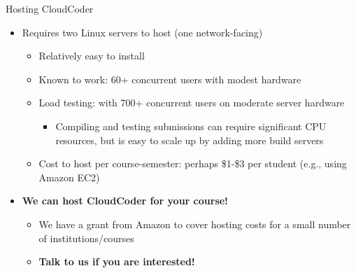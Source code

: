 \documentclass{beamer}
\begin{document}
\begin{frame}{Hosting CloudCoder}

\begin{itemize}
  \item Requires two Linux servers to host (one network-facing)
    \begin{itemize}
    \item Relatively easy to install
    \item Known to work: 60+ concurrent users with modest hardware
    \item Load testing: with 700+ concurrent users
          on moderate server hardware
      \begin{itemize}
      \item Compiling and testing submissions can require significant
            CPU resources, but is easy to scale up by adding more
            build servers
      \end{itemize}
    \item Cost to host per course-semester: perhaps \$1-\$3 per student
          (e.g., using Amazon EC2)
    \end{itemize}
  \item {\bf We can host CloudCoder for your course!}
    \begin{itemize}
    \item We have a grant from Amazon to cover hosting costs for
          a small number of institutions/courses
    \item {\bf Talk to us if you are interested!}
    \end{itemize}
\end{itemize}

\end{frame}
\end{document}
